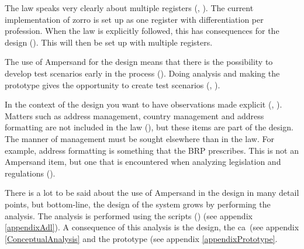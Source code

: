 The law speaks very clearly about multiple registers (, ).
The current implementation of \acrshort{zorro} is set up as one register with differentiation per profession.
When the law is explicitly followed, this has consequences for the design ().
This will then be set up with multiple registers.
\label{s:4_5_test_scenario}

The use of Ampersand for the design means that there is the possibility to develop test scenarios early in the process ().
Doing analysis and making the prototype gives the opportunity to create test scenarios (, ).
\label{s:4_6_brp}

In the context of the design you want to have observations made explicit (, ).
Matters such as address management, country management and address formatting are not included in the law (), but these items are part of the design.
The manner of management must be sought elsewhere than in the law.
For example, address formatting is something that the BRP prescribes.
This is not an Ampersand item, but one that is encountered when analyzing legislation and regulations ().
\label{s:4_7_total_design}

There is a lot to be said about the use of Ampersand in the design in many detail points, but bottom-line, the design of the system grows by performing the analysis.
The analysis is performed using the scripts () (see appendix \ref{appendixAdl}).
A consequence of this analysis is the design, the \acrshort{ca}~(see appendix \ref{ConceptualAnalysis} and the prototype (see appendix \ref{appendixPrototype}.
\label{s:4_8_user_experience}

